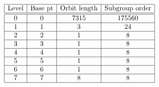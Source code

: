 

$$
\begin{array}{|c|c|c|c|}
\hline
\mbox{Level} & \mbox{Base pt} & \mbox{Orbit length} & \mbox{Subgroup order}\\
\hline
\hline
0 & 0 & 7315 & 175560\\
\hline
1 & 1 & 3 & 24\\
\hline
2 & 2 & 1 & 8\\
\hline
3 & 3 & 1 & 8\\
\hline
4 & 4 & 1 & 8\\
\hline
5 & 5 & 1 & 8\\
\hline
6 & 6 & 1 & 8\\
\hline
7 & 7 & 8 & 8\\
\hline
\end{array}
$$

